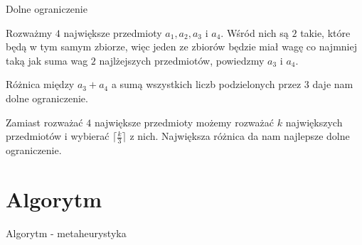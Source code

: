 \documentclass{beamer}
\begin{document}
\begin{frame}[t]{Dolne ograniczenie}

Rozważmy $4$ największe przedmioty $a_1, a_2, a_3$ i $a_4$. Wśród nich są $2$ takie, które będą w tym samym zbiorze, więc jeden ze zbiorów będzie miał wagę co najmniej taką jak suma wag $2$ najlżejszych przedmiotów, powiedzmy $a_3$ i $a_4$.

Różnica między $a_3+a_4$ a sumą wszystkich liczb podzielonych przez $3$ daje nam dolne ograniczenie.

Zamiast rozważać $4$ największe przedmioty możemy rozważać $k$ największych przedmiotów i wybierać $\lceil \frac{k}{3} \rceil$ z nich. Największa różnica da nam najlepsze dolne ograniczenie.

\end{frame}

\section{Algorytm}

\begin{frame}{Algorytm - metaheurystyka}


\end{frame}
\end{document}
